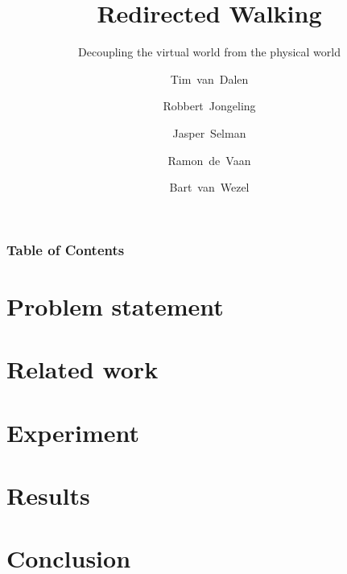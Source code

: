 \documentclass[12pt,aspectratio=169]{beamer} %
\title{Redirected Walking}
\subtitle{Decoupling the virtual world from the physical world}
\author{Tim~van~Dalen \and Robbert~Jongeling \and Jasper~Selman \and Ramon~de~Vaan \and Bart~van~Wezel}
\begin{document}
\begin{titleframe}
\end{titleframe}

\begin{frame}
	\frametitle{Table of Contents}
	\tableofcontents
\end{frame}

\section{Problem statement}


\section{Related work}


\section{Experiment}


\section{Results}


\section{Conclusion}

\end{document}
